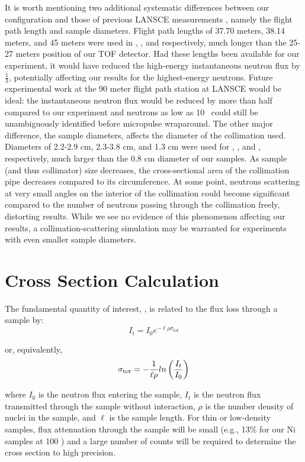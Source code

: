 It is worth mentioning two additional systematic differences between our configuration and
those of previous LANSCE measurements \cite{Shane2010, Finlay1993, Abfalterer2001}, namely the
flight path length and sample diameters. Flight path lengths of 37.70 meters, 38.14 meters, and 45
meters were used in \cite{Finlay1993}, \cite{Abfalterer2001}, and \cite{Shane2010} respectively, 
much longer than the 25-27 meters position of our TOF detector.
Had these lengths been available for our experiment,
it would have reduced the high-energy instantaneous neutron flux by 
$\frac{1}{3}$, potentially affecting our results for the highest-energy neutrons. Future
experimental work at the 90 meter flight path station at LANSCE would be ideal: the
instantaneous neutron flux would be reduced by more than half compared to our experiment
and neutrons as low as 10 \mega\electronvolt\ could still be unambiguously identified before micropulse wraparound.
The other major difference, the sample diameters, affects the diameter of the collimation used.
Diameters of  2.2-2.9 cm, 2.3-3.8 cm, and 1.3 cm were used for \cite{Shane2010},
\cite{Finlay1993}, and \cite{Abfalterer2001}, respectively, much larger than the 0.8 cm diameter of
our samples. As sample (and thus collimator) size decreases, the cross-sectional area of the
collimation pipe decreases compared to its circumference. At some point,
neutrons scattering at very
small angles on the interior of the collimation could become significant compared to the number of
neutrons passing through the collimation freely, distorting results.
While we see no evidence of this phenomenon affecting
our results, a collimation-scattering simulation may be warranted for
experiments with even smaller sample diameters.

\section{Cross Section Calculation}
The fundamental quantity of interest, \tot, is related to the flux
loss through a sample by:
\begin{equation}
I_{t} = I_{0}e^{-{\ell\rho\sigma_{tot}}}
\end{equation}

\noindent
or, equivalently,
\begin{equation}
    \tot = -\frac{1}{\ell\rho}ln\left(\frac{I_{t}}{I_{0}}\right)
\end{equation}

\noindent
where $I_{0}$ is the neutron flux entering the sample, $I_{t}$ is the neutron
flux transmitted through the sample without interaction, $\rho$ is the number
density of nuclei in the sample, and $\ell$ is the sample length. For thin
or low-density samples, flux attenuation through the sample will be small
(e.g., 13\% for our Ni samples at 100 \mega\electronvolt) and a large number
of counts will be required to determine the cross section to high
precision.

